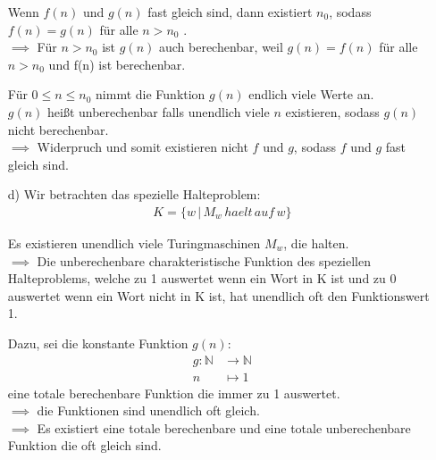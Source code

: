 \documentclass[a4paper,onecolumn,oneside,12pt,ngerman]{article}
\theoremstyle{plain} %
\theoremstyle{definition} %
\theoremstyle{remark} %
\theoremstyle{plain}
\newcommand{\NN}{\mathbb{N}} %
\begin{document}
\begin{itemize}
    Wenn $f(n)$ und $g(n)$ fast gleich sind, dann existiert $n_0$, sodass $f(n) = g(n)$ für alle $n > n_0$ .\\$\implies$ Für $n > n_0$ ist $g(n)$ auch berechenbar, weil $g(n) = f(n)$ für alle $n > n_0$ und f(n) ist berechenbar. 
     
     Für $0 \leq n \leq n_0$ nimmt die Funktion $g(n)$ endlich viele Werte an.\\ $g(n)$ heißt unberechenbar falls unendlich viele $n$ existieren, sodass $g(n)$ nicht berechenbar.\\$\implies$ Widerpruch und somit existieren nicht $f$ und $g$, sodass $f$ und $g$ fast gleich sind.
    \item[d)]
    Wir betrachten das spezielle Halteproblem:
    \begin{align*}
	K = \{w\, | \,M_w\, haelt\, auf\, w\}
    \end{align*}
    
    Es existieren unendlich viele Turingmaschinen $M_w$, die halten.\\$\implies$ Die unberechenbare charakteristische Funktion des speziellen Halteproblems, welche zu 1 auswertet wenn ein Wort in K ist und zu 0 auswertet wenn ein Wort nicht in K ist, hat unendlich oft den Funktionswert 1.
    
    Dazu, sei die konstante Funktion $g(n)$:
    \begin{align*}
        g: \NN &\to \NN \\
        n &\mapsto 1
    \end{align*}
    eine totale berechenbare Funktion die immer zu 1 auswertet.\\ $\implies$ die Funktionen sind unendlich oft gleich.\\$\implies$ Es existiert eine totale berechenbare und eine totale unberechenbare Funktion die oft gleich sind.
\end{itemize}
\end{document}
